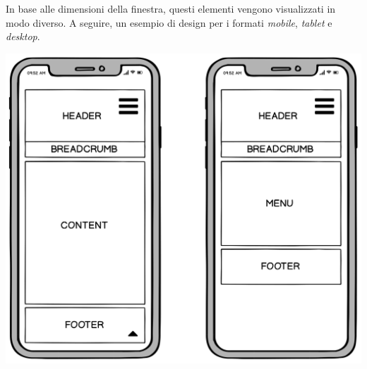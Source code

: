 In base alle dimensioni della finestra, questi elementi vengono visualizzati in modo diverso. A seguire, un esempio di design per i formati \textit{mobile}, \textit{tablet} e \textit{desktop}.

\begin{center}
	\includegraphics[scale=0.15]{img/Mobile}
\end{center}


